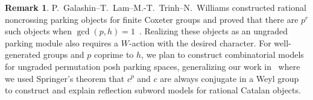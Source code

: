\documentclass[11pt]{amsart}
\theoremstyle{definition}
\newtheorem{remark}[theorem]{Remark}
\begin{document}
\begin{remark}
P.~Galashin--T.~Lam--M.-T.~Trinh--N.~Williams constructed rational noncrossing parking objects for finite Coxeter groups and proved that there are $p^r$ such objects when $\gcd(p,h)=1$~\cite[Theorem~1.8]{GLTWRational}.  Realizing these objects as an ungraded parking module also requires a $W$-action with the desired character.
For well-generated groups and $p$ coprime to $h$, we plan to construct combinatorial models for ungraded permutation posh parking spaces, generalizing our work in~\cite{DefantWilliams} where we used Springer's theorem that $c^p$ and $c$ are always conjugate in a Weyl group to construct and explain reflection subword models for rational Catalan objects.
\end{remark}




\end{document}
